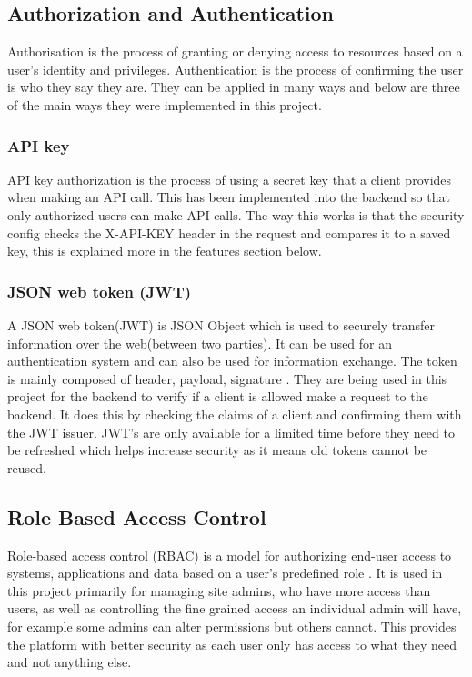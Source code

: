 \documentclass[]{project_report}
\begin{document}
\subsection{Authorization and Authentication}

Authorisation is the process of granting or denying access to resources based on a user's identity and privileges. Authentication is the process of confirming the user is who they say they are. They can be applied in many ways and below are three of the main ways they were implemented in this project.

\subsubsection{API key}

API key authorization is the process of using a secret key that a client provides when making an API call. This has been implemented into the backend so that only authorized users can make API calls. The way this works is that the security config checks the X-API-KEY header in the request and compares it to a saved key, this is explained more in the features section below.

\subsubsection{JSON web token (JWT)}

A JSON web token(JWT) is JSON Object which is used to securely transfer information over the web(between two parties). It can be used for an authentication system and can also be used for information exchange. The token is mainly composed of header, payload, signature \cite{jwt}. They are being used in this project for the backend to verify if a client is allowed make a request to the backend. It does this by checking the claims of a client and confirming them with the JWT issuer. JWT's are only available for a limited time before they need to be refreshed which helps increase security as it means old tokens cannot be reused.

\subsection{Role Based Access Control}

Role-based access control (RBAC) is a model for authorizing end-user access to systems, applications and data based on a user’s predefined role \cite{ibm_rbac}. It is used in this project primarily for managing site admins, who have more access than users, as well as controlling the fine grained access an individual admin will have, for example some admins can alter permissions but others cannot. This provides the platform with better security as each user only has access to what they need and not anything else.
\end{document}
